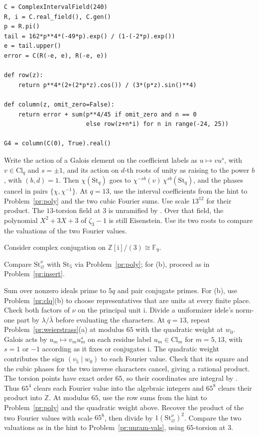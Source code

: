 \documentclass[reqno]{amsart}
\theoremstyle{definition}
\theoremstyle{plain}
\theoremstyle{remark}
\newcommand{\Z}{\mathbb{Z}}
\newcommand{\F}{\mathbb{F}}
\newcommand{\ii}{\mathrm{i}}
\newcommand{\St}{\mathrm{St}}
\newcommand{\Cl}{\mathrm{Cl}}
\begin{document}
\begin{description}
\begin{verbatim}
C = ComplexIntervalField(240)
R, i = C.real_field(), C.gen()
p = R.pi()
tail = 162*p**4*(-49*p).exp() / (1-(-2*p).exp())
e = tail.upper()
error = C(R(-e, e), R(-e, e))

def row(z):
    return p**4*(2+(2*p*z).cos()) / (3*(p*z).sin()**4)

def column(z, omit_zero=False):
    return error + sum(p**4/45 if omit_zero and n == 0
                       else row(z+n*i) for n in range(-24, 25))

G4 = column(C(0), True).real()
\end{verbatim}
\endgroup
\item[\ref{pr:unram-vals}] Write the action of a Galois element on the coefficient labels as \(u \mapsto v u^s\), with \(v \in \Cl_q\) and \(s = \pm 1\), and its action on \(d\)-th roots of unity as raising to the power \(b\), with \((b, d) = 1\).  Then \(\chi(\St_q)\) goes to \(\chi^{-sb}(v)\,\chi^{sb}(\St_q)\), and the phases cancel in pairs \(\{\chi, \chi^{-1}\}\).  At \(q = 13\), use the interval coefficients from the hint to Problem~\ref{pr:poly} and the two cubic Fourier sums.  Use scale \(13^{12}\) for their product.  The \(13\)-torsion field at \(3\) is unramified by \cite[Prop.~VII.4.1(a)]{Si1}.  Over that field, the polynomial \(X^2+3X+3\) of \(\zeta_3-1\) is still Eisenstein.  Use its two roots to compare the valuations of the two Fourier values.
\item[\ref{pr:price}] Consider complex conjugation on \(\Z[\ii]/(3) \cong \F_9\).
\item[\ref{pr:ram-empty}] Compare \(\St^\nu_\varnothing\) with \(\St_5\) via Problem~\ref{pr:poly}; for (b), proceed as in Problem~\ref{pr:insert}.
\item[\ref{pr:ram-ratios}] Sum over nonzero ideals prime to \(5q\) and pair conjugate primes.  For (b), use Problem~\ref{pr:clq}\textup{(b)} to choose representatives that are units at every finite place.  Check both factors of \(\nu\) on the principal unit \(\ii\).  Divide a uniformizer idele's norm-one part by \(\lambda/\bar\lambda\) before evaluating the characters.  At \(q=13\), repeat Problem~\ref{pr:weierstrass}\textup{(a)} at modulus \(65\) with the quadratic weight at \(w_0\).  Galois acts by \(u_m\mapsto v_m u_m^s\) on each residue label \(u_m\in\Cl_m\) for \(m=5,13\), with \(s=1\) or \(-1\) according as it fixes or conjugates \(\ii\).  The quadratic weight contributes the sign \((v_5\mid w_0)\) to each Fourier value.  Check that its square and the cubic phases for the two inverse characters cancel, giving a rational product.  The torsion points have exact order \(65\), so their coordinates are integral by \cite[Thm.~VII.3.4(a)]{Si1}.  Thus \(65^4\) clears each Fourier value into the algebraic integers and \(65^8\) clears their product into \(\Z\).  At modulus \(65\), use the row sums from the hint to Problem~\ref{pr:poly} and the quadratic weight above.  Recover the product of the two Fourier values with scale \(65^8\), then divide by \(1(\St^\nu_\varnothing)^2\).  Compare the two valuations as in the hint to Problem~\ref{pr:unram-vals}, using \(65\)-torsion at \(3\).

\end{description}
\end{document}
